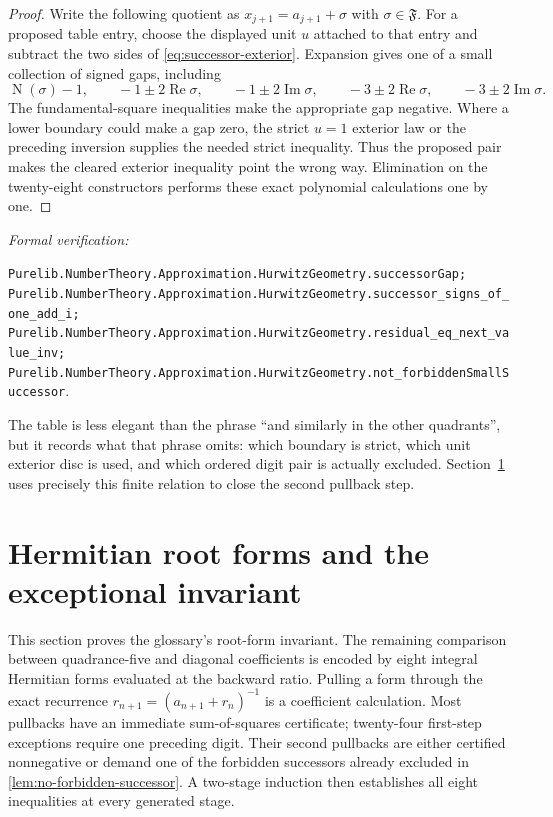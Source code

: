 \documentclass[11pt]{article}
\newcommand{\Norm}[1]{\operatorname{N}\!\left(#1\right)}
\newcommand{\leanref}[1]{\par\smallskip\noindent
  \emph{Formal verification:}\par\nobreak
  {\raggedright\nolinkurl{#1}.\par}}
\begin{document}
\begin{proof}
Write the following quotient as $x_{j+1}=a_{j+1}+\sigma$ with
$\sigma\in\mathfrak F$.  For a proposed table entry, choose the displayed
unit $u$ attached to that entry and subtract the two sides of
\eqref{eq:successor-exterior}.  Expansion gives one of a small collection of
signed gaps, including
\[
 \Norm\sigma-1,\qquad -1\pm2\operatorname{Re}\sigma,
 \qquad -1\pm2\operatorname{Im}\sigma,
 \qquad -3\pm2\operatorname{Re}\sigma,
 \qquad -3\pm2\operatorname{Im}\sigma.
\]
The fundamental-square inequalities make the appropriate gap negative.
Where a lower boundary could make a gap zero, the strict $u=1$ exterior law
or the preceding inversion supplies the needed strict inequality.  Thus the
proposed pair makes the cleared exterior inequality point the wrong way.
Elimination on the twenty-eight constructors performs these exact polynomial
calculations one by one.
\end{proof}

\leanref{Purelib.NumberTheory.Approximation.HurwitzGeometry.successorGap;
Purelib.NumberTheory.Approximation.HurwitzGeometry.successor_signs_of_one_add_i;
Purelib.NumberTheory.Approximation.HurwitzGeometry.residual_eq_next_value_inv;
Purelib.NumberTheory.Approximation.HurwitzGeometry.not_forbiddenSmallSuccessor}

The table is less elegant than the phrase ``and similarly in the other
quadrants'', but it records what that phrase omits: which boundary is strict,
which unit exterior disc is used, and which ordered digit pair is actually
excluded.  Section~\ref{sec:hermitian-invariant} uses precisely this finite
relation to close the second pullback step.

\section{Hermitian root forms and the exceptional invariant}
\label{sec:hermitian-invariant}

This section proves the glossary's root-form invariant.  The remaining
comparison between quadrance-five and diagonal coefficients is encoded by eight integral
Hermitian forms evaluated at the backward ratio.  Pulling a form through the
exact recurrence $r_{n+1}=(a_{n+1}+r_n)^{-1}$ is a coefficient calculation.
Most pullbacks have an immediate sum-of-squares certificate; twenty-four
first-step exceptions require one preceding digit.  Their second pullbacks
are either certified nonnegative or demand one of the forbidden successors
already excluded in \cref{lem:no-forbidden-successor}.  A two-stage induction
then establishes all eight inequalities at every generated stage.
\end{document}
